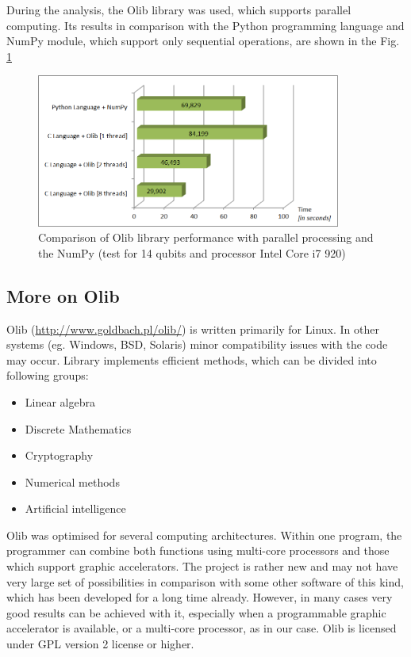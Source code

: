 \documentclass[10pt, a5paper]{article}
\begin{document}
During the analysis, the Olib library was used, which supports parallel computing. Its results in comparison with the Python programming language and NumPy module, which support only sequential operations, are shown in the Fig. \ref{fig:lf6}

\begin{figure}
  \centering
  \includegraphics[width=10cm]{18_2012_6.png}
\caption{Comparison of Olib library performance with parallel processing and the NumPy (test for 14 qubits and processor Intel Core i7 920)}
\label{fig:lf6}
\end{figure}

\subsection*{More on Olib}

Olib (\url{http://www.goldbach.pl/olib/}) is written primarily for Linux. In other systems (eg. Windows, BSD, Solaris) minor compatibility issues with the code may occur. Library implements efficient methods, which can be divided into following groups:

\begin{itemize}
  \item Linear algebra
  \item Discrete Mathematics
  \item Cryptography
  \item Numerical methods
  \item Artificial intelligence
\end{itemize}

Olib was optimised for several computing architectures. Within one program, the programmer can combine both functions using multi-core processors and those which support graphic accelerators. The project is rather new and may not have very large set of possibilities in comparison with some other software of this kind, which has been developed for a long time already. However, in many cases very good results can be achieved with it, especially when a programmable graphic accelerator is available, or a multi-core processor, as in our case. Olib is licensed under GPL version 2 license or higher.
\end{document}
